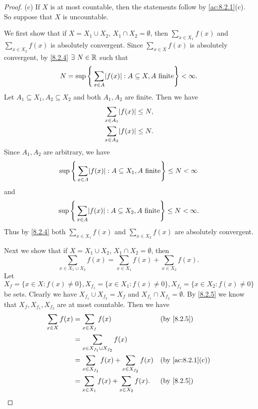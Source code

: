 \begin{proof}{(c)}
  If \(X\) is at most countable, then the statements follow by \cref{ac:8.2.1}(c).
  So suppose that \(X\) is uncountable.

  We first show that if \(X = X_1 \cup X_2\), \(X_1 \cap X_2 = \emptyset\), then \(\sum_{x \in X_1} f(x)\) and \(\sum_{x \in X_2} f(x)\) is absolutely convergent.
  Since \(\sum_{x \in X} f(x)\) is absolutely convergent, by \cref{8.2.4} \(\exists\ N \in \mathbb{R}\) such that
  \[
    N = \sup\Bigg\{\sum_{x \in A} \abs{f(x)} : A \subseteq X, A \text{ finite}\Bigg\} < \infty.
  \]
  Let \(A_1 \subseteq X_1, A_2 \subseteq X_2\) and both \(A_1, A_2\) are finite.
  Then we have
  \begin{align*}
     & \sum_{x \in A_1} \abs{f(x)} \leq N, \\
     & \sum_{x \in A_2} \abs{f(x)} \leq N.
  \end{align*}
  Since \(A_1, A_2\) are arbitrary, we have
  \[
    \sup\Bigg\{\sum_{x \in A} \abs{f(x)} : A \subseteq X_1, A \text{ finite}\Bigg\} \leq N < \infty
  \]
  and
  \[
    \sup\Bigg\{\sum_{x \in A} \abs{f(x)} : A \subseteq X_2, A \text{ finite}\Bigg\} \leq N < \infty.
  \]
  Thus by \cref{8.2.4} both \(\sum_{x \in X_1} f(x)\) and \(\sum_{x \in X_2} f(x)\) are absolutely convergent.

  Next we show that if \(X = X_1 \cup X_2\), \(X_1 \cap X_2 = \emptyset\), then
  \[
    \sum_{x \in X_1 \cup X_2} f(x) = \sum_{x \in X_1} f(x) + \sum_{x \in X_2} f(x).
  \]
  Let \(X_f = \{x \in X : f(x) \neq 0\}, X_{f_1} = \{x \in X_1 : f(x) \neq 0\}, X_{f_2} = \{x \in X_2 : f(x) \neq 0\}\) be sets.
  Clearly we have \(X_{f_1} \cup X_{f_2} = X_f\) and \(X_{f_1} \cap X_{f_2} = \emptyset\).
  By \cref{8.2.5} we know that \(X_f, X_{f_1}, X_{f_2}\) are at most countable.
  Then we have
  \begin{align*}
    \sum_{x \in X} f(x) & = \sum_{x \in X_f} f(x)                                 &  & \text{(by \cref{8.2.5})}       \\
                        & = \sum_{x \in X_{f_1} \cup X_{f_2}} f(x)                                                    \\
                        & = \sum_{x \in X_{f_1}} f(x) + \sum_{x \in X_{f_2}} f(x) &  & \text{(by \cref{ac:8.2.1}(c))} \\
                        & = \sum_{x \in X_1} f(x) + \sum_{x \in X_2} f(x).        &  & \text{(by \cref{8.2.5})}
  \end{align*}


\end{proof}
